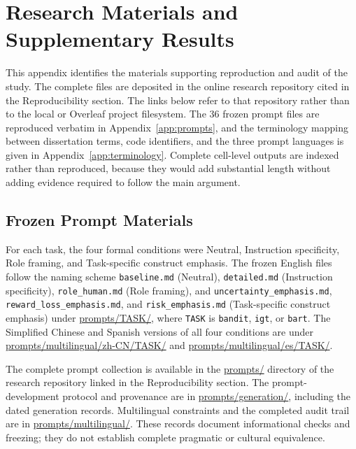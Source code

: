 \documentclass[logo,msc,inf]{infthesis}       %
\begin{document}





\appendix
\sloppy

\chapter{Research Materials and Supplementary Results}
\label{app:materials}

This appendix identifies the materials supporting reproduction and audit of the
study. The complete files are deposited in the online research repository cited
in the Reproducibility section. The links below refer to that repository rather
than to the local or Overleaf project filesystem. The 36 frozen prompt files are
reproduced verbatim in Appendix~\ref{app:prompts}, and the terminology mapping
between dissertation terms, code identifiers, and the three prompt languages is
given in Appendix~\ref{app:terminology}. Complete cell-level outputs are indexed
rather than reproduced, because they would add substantial length without adding
evidence required to follow the main argument.

\section{Frozen Prompt Materials}

For each task, the four formal conditions were Neutral, Instruction
specificity, Role framing, and Task-specific construct emphasis. The frozen
English files follow the naming scheme \texttt{baseline.md} (Neutral),
\texttt{detailed.md} (Instruction specificity), \texttt{role\_human.md} (Role
framing), and \texttt{uncertainty\_emphasis.md},
\texttt{reward\_loss\_emphasis.md}, and \texttt{risk\_emphasis.md}
(Task-specific construct emphasis) under \url{prompts/TASK/}, where
\texttt{TASK} is \texttt{bandit}, \texttt{igt}, or \texttt{bart}. The
Simplified Chinese and Spanish versions of all four conditions are under
\url{prompts/multilingual/zh-CN/TASK/} and
\url{prompts/multilingual/es/TASK/}.

The complete prompt collection is available in the \url{prompts/} directory of
the research repository linked in the Reproducibility section. The
prompt-development protocol and provenance are in \url{prompts/generation/},
including the dated generation records.
Multilingual constraints and the completed audit trail are in
\url{prompts/multilingual/}. These records document informational checks and
freezing; they do not establish complete pragmatic or cultural equivalence.
\end{document}
